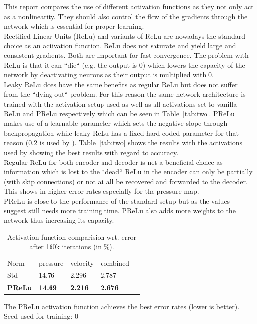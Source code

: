 \documentclass[acmtog]{techreportacmart}
\begin{document}
This report compares the use of different activation functions as they not only act as a nonlinearity. They should also control the flow of the gradients through the network which is essential for proper learning.\\
Rectified Linear Units (ReLu) and variants of ReLu are nowadays the standard choice as an activation function. ReLu does not saturate and yield large and consistent gradients. Both are important for fast convergence. The problem with ReLu is that it can ``die`` (e.g. the output is 0) which lowers the capacity of the network by deactivating neurons as their output is multiplied with 0.\\
Leaky ReLu does have the same benefits as regular ReLu but does not suffer from the ``dying out`` problem. For this reason the same network architecture is trained with the activation setup \cite{Thuerey20} used as well as all activations set to vanilla ReLu and PReLu respectively which can be seen in Table~\ref{tab:two}. PReLu makes use of a learnable parameter which sets the negative slope through backpropagation while leaky ReLu has a fixed hard coded parameter for that reason ($0.2$ is used by \cite{Thuerey20}). Table~\ref{tab:two} shows the results with the activations used by \cite{Thuerey20} showing the best results with regard to accuracy. \\
Regular ReLu for both encoder and decoder is not a beneficial choice as information which is lost to the ``dead`` ReLu in the encoder can only be partially (with skip connections) or not at all be recovered and forwarded to the decoder. This shows in higher error rates especially for the pressure map. \\
PReLu is close to the performance of the standard setup but as the values suggest still needs more training time. PReLu also adds more weights to the network thus increasing its capacity. 

\begin{table}[h]
\caption{Activation function comparision wrt. error \\ after 160k iterations (in \%).}
\label{tab:three}
\begin{center}
\begin{tabular}{l|l|l|l|l}
  \toprule
  Norm   & pressure   &	velocity    & combined \\
  Std	 & 14.76	  & 2.296		&  2.787   \\
  \bf PReLu	 & \bf 14.69	  & \bf 2.216		& \bf 2.676	   \\
  \bottomrule
\end{tabular}
\end{center}
\bigskip\centering
\footnotesize The PReLu activation function achieves  
the best error rates (lower is better). \\
Seed used for training: $0$
\end{table}%
\end{document}

